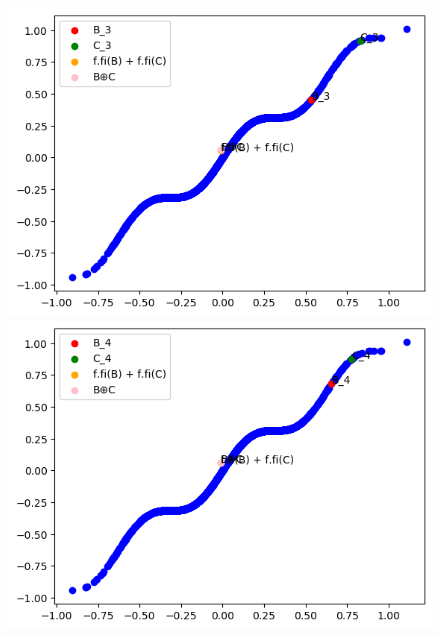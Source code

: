 \documentclass{report}
\begin{document}
            \begin{figure}[h]
                \centering
                \begin{minipage}{0.5\textwidth}
                    \centering
                    \includegraphics[width=0.9\linewidth]{./images/3.png}
                \end{minipage}%
                \begin{minipage}{0.5\textwidth}
                    \centering
                    \includegraphics[width=0.9\linewidth]{./images/4.png}
                \end{minipage}
            \end{figure}
            
\end{document}
